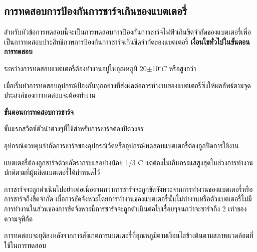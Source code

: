 \subsection{การทดสอบการป้องกันการชาร์จเกินของแบตเตอรี่}
สำหรับหัวข้อการทดสอบนี้จะเป็นการทดสอบการป้องกันการชาร์จไฟฟ้าเกินขีดจำกัดของแบตเตอรี่เพื่อเป็นการทดสอบประสิทธิภาพการป้องกันการชาร์จเกินขีดจำกัดของแบตเตอรี่
\newline
\newline
\textbf{เงื่อนไขทั่วไปในขั้นตอนการทดสอบ}
\begin{itemize}
{\item ระหว่างการทดสอบแบตเตอรี่ต้องทำงานอยู่ในอุณหภูมิ 20$\pm$10$^{\circ}C$ หรือสูงกว่า}
{\item เมื่อเริ่มทำการทดสอบอุปกรณ์ป้องกันทุกอย่างที่ส่งผลต่อการทำงานของแบตเตอรี่ซึ่งให้ผลลัพธ์ตามจุดประสงค์ของการทดสอบจะต้องทำงาน}
\end{itemize}
\textbf{ขั้นตอนการทดสอบการชาร์จ}
\begin{itemize}
{\item ขั้นแรกสวิตซ์ตัวนำต่างๆที่ใช้สำหรับการชาร์จต้องปิดวงจร}
{\item อุปกรณ์ควบคุมจำกัดการชาร์จของอุปกรณ์วัดหรืออุปกรณ์ทดสอบแบตเตอรี่ต้องถูกปิดการใช้งาน}
{\item แบตเตอรี่ต้องถูกชาร์จด้วยอัตรากระแสอย่างน้อย 1/3 C แต่ต้องไม่เกินกระแสสูงสุดในช่วงการทำงานปกติตามที่ผู้ผลิตแบตเตอรี่ได้กำหนดไว้}
{\item การชาร์จจะถูกดำเนินไปอย่างต่อเนื่องจนกว่าการชาร์จจะถูกขัดจังหวะจากการทำงานของแบตเตอรี่หรือการชาร์จถึงขีดจำกัด เมื่อการขัดจังหวะโดยการทำงานของแบตเตอรี่นั้นไม่ทำงานหรือตัวแบตเตอรี่ไม่มีการทำงานในส่วนของการขัดจังหวะนี้การชาร์จจะถูกดำเนินต่อไปเรื่อยๆจนกว่าจะชาร์จถึง 2 เท่าของความจุพิกัด}
{\item การทดสอบจะยุติลงหลังจากการสังเกตการแบตเตอรี่ที่อุณหภูมิตามเงื่อนไขข้างต้นตามสภาพแวดล้อมที่ใช้ในการทดสอบ}
\end{itemize}
